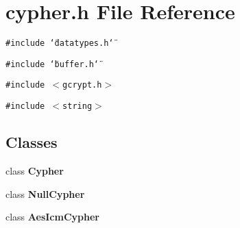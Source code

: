 \section{cypher.h File Reference}
\label{cypher_8h}
{\tt \#include \char`\"{}datatypes.h\char`\"{}}\par
{\tt \#include \char`\"{}buffer.h\char`\"{}}\par
{\tt \#include $<$gcrypt.h$>$}\par
{\tt \#include $<$string$>$}\par
\subsection*{Classes}
\begin{CompactItemize}
\item 
class {\bf Cypher}
\item 
class {\bf Null\-Cypher}
\item 
class {\bf Aes\-Icm\-Cypher}
\end{CompactItemize}
